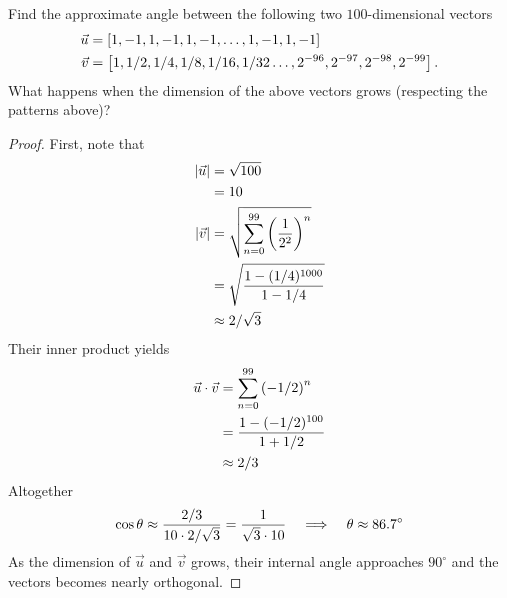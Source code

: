 \documentclass{tutorial}
\begin{document}
\begin{prob} Find the approximate angle between the following two $100$-dimensional vectors
\begin{align*}
  \vec{u} & = \left[ 1, -1,  1, -1,  1, -1, \dots, 1, -1,  1, -1 \right] \\
  \vec{v} & = \left[ 1,1/2,1/4,1/8,1/16,1/32\dots, 2^{-96}, 2^{-97},  2^{-98}, 2^{-99}\right].
\end{align*}
What happens when the dimension of the above vectors grows (respecting the patterns above)?
\end{prob} \ifsolns \begin{proof}
First, note that
\begin{align*}
  |\vec{u}| & = \sqrt{100} \\
            & = 10 \\
  |\vec{v}| & = \sqrt{\sum_{n=0}^{99} \left(\frac{1}{2^2}\right)^n} \\
            & = \sqrt{\frac{1-(1/4)^{1000}}{1-1/4}} \\
            & \approx 2/\sqrt{3}
\end{align*}
Their inner product yields
\begin{align*}
  \vec{u} \cdot \vec{v}
  & = \sum_{n=0}^{99} \left( -1/2 \right)^n \\
  & = \frac{1 - (-1/2)^{100}}{1 + 1/2} \\
  & \approx 2/3
\end{align*}
Altogether
\[
  \cos \theta \approx \frac{2/3}{10 \cdot 2/\sqrt{3}} = \frac{1}{\sqrt{3} \cdot 10}
  \hspace{0.15in} \Longrightarrow \hspace{0.15in}
  \theta \approx 86.7^{\circ}
\]
As the dimension of $\vec{u}$ and $\vec{v}$ grows, their internal angle approaches $90^{\circ}$ and the vectors becomes nearly orthogonal.
\end{proof}\else \vspace{3in} \fi
\end{document}

